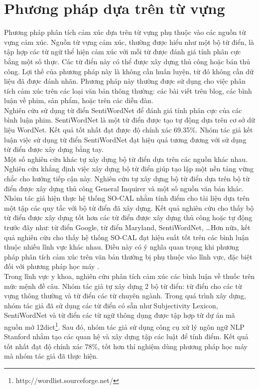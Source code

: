\section{Phương pháp dựa trên từ vựng}
Phương pháp phân tích cảm xúc dựa trên từ vựng phụ thuộc vào các nguồn từ vựng cảm xúc. Nguồn từ vựng cảm xúc, thường được hiểu như một bộ từ điển, là tập hợp các từ ngữ thể hiện cảm xúc với mỗi từ được đánh giá tính phân cực bằng một số thực. Các từ điển này có thể được xây dựng thủ công hoặc bán thủ công. Lợi thế của phương pháp này là không cần huấn luyện, từ đó không cần dữ liệu đã được đánh nhãn. Phương pháp này thường được sử dụng cho việc phân tích cảm xúc trên các loại văn bản thông thường: các bài viết trên blog, các bình luận về phim, sản phẩm, hoặc trên các diễn đàn. \\

Nghiên cứu \cite{ohana2009sentiment} sử dụng từ điển SentiWordNet để đánh giá tính phân cực của các bình luận phim. SentiWordNet là một từ điển được tạo tự động dựa trên cơ sở dữ liệu WordNet. Kết quả tốt nhất đạt được độ chính xác 69.35\%. Nhóm tác giả kết luận việc sử dụng từ điển SentiWordNet đạt hiệu quả tương đương với sử dụng từ điển được xây dựng bằng tay.\\

Một số nghiên cứu khác tự xây dựng bộ từ điển dựa trên các nguồn khác nhau. Nghiên cứu \cite{taboada2011lexicon} khẳng định việc xây dựng bộ từ điển giúp tạo lập một nền tảng vững chắc cho hướng tiếp cận này. Nghiên cứu tự xây dựng bộ từ điển dựa trên bộ từ điển được xây dựng thủ công General Inquirer và một số nguồn văn bản khác. Nhóm tác giả hiện thực hệ thống SO-CAL nhằm tính điểm cho tài liệu dựa trên một tập các quy tắc với bộ từ điển đã xây dựng. Kết quả nghiên cứu cho thấy bộ từ điển được xây dựng tốt hơn các từ điển được xây dựng thủ công hoặc tự động trước đây như: từ điển Google, từ điển Maryland, SentiWordNet, \ldots Hơn nữa, kết quả nghiên cứu cho thấy hệ thống SO-CAL đạt hiệu suất tốt trên các bình luận thuộc nhiều lĩnh vực khác nhau. Điều này có ý nghĩa quan trọng khi phương pháp phân tích cảm xúc trên văn bản thường bị phụ thuộc vào lĩnh vực, đặc biệt đối với phương pháp học máy \cite{Giachanou2016}.\\

Trong lĩnh vực y khoa, nghiên cứu \cite{na2012sentiment} phân tích cảm xúc các bình luận về thuốc trên mức mệnh đề câu. Nhóm tác giả tự xây dựng 2 bộ từ điển: từ điển cho các từ vựng thông thường và từ điển các từ chuyên ngành. Trong quá trình xây dựng, nhóm tác giả đã sử dụng các từ điển có sẵn như Subjectivity Lexicon, SentiWordNet và từ điển các từ ngữ thông dụng được tập hợp từ dự án mã nguồn mở 12dict\footnote{http://wordlist.sourceforge.net/}. Sau đó, nhóm tác giả sử dụng công cụ xử lý ngôn ngữ NLP Stanford nhằm tạo các quan hệ và xây dựng tập các luật để tính điểm. Kết quả tốt nhất đạt độ chính xác $78\%$, tốt hơn thí nghiệm dùng phương pháp học máy mà nhóm tác giả đã thực hiện.
